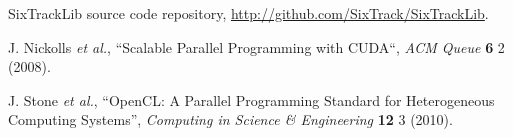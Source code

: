 \documentclass[a4paper,
              ]{jacow}
\begin{document}
\begin{thebibliography}{99}











SixTrackLib source code repository,
\url{http://github.com/SixTrack/SixTrackLib}.

J. Nickolls {\it et al.}, ``Scalable Parallel Programming with CUDA``, {\it ACM Queue} {\bf 6} 2 (2008).

J. Stone {\it et al.}, ``OpenCL: A Parallel Programming Standard for Heterogeneous Computing Systems'', {\it  Computing in Science & Engineering } {\bf 12} 3 (2010).

\end{thebibliography}
\null 
\end{document}
